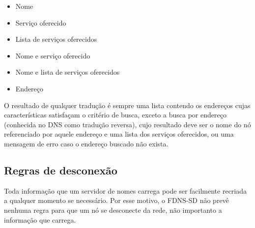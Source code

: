     \begin{itemize}
        \item Nome
        \item Serviço oferecido
        \item Lista de serviços oferecidos
        \item Nome e serviço oferecido
        \item Nome e lista de serviços oferecidos
        \item Endereço
    \end{itemize}
    
    O resultado de qualquer tradução é sempre uma lista contendo os endereços
    cujas características satisfaçam o critério de busca, exceto a busca por endereço
    (conhecida no DNS como tradução reversa), cujo resultado deve ser o nome do
    nó referenciado por aquele endereço e uma lista dos serviços oferecidos, ou
    uma mensagem de erro caso o endereço buscado não exista.
    
\subsection{Regras de desconexão}
    Toda informação que um servidor de nomes carrega pode ser facilmente recriada
    a qualquer momento se necessário. Por esse motivo, o FDNS-SD não prevê nenhuma
    regra para que um nó se desconecte da rede, não importanto a informação que
    carrega.